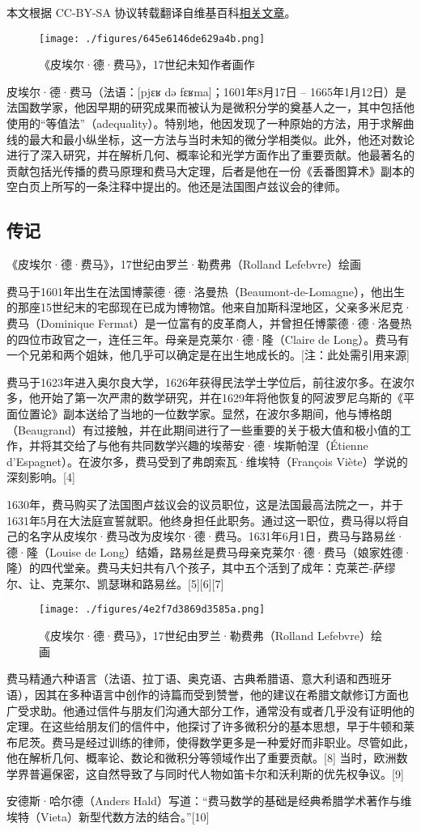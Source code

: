 
本文根据 CC-BY-SA 协议转载翻译自维基百科\href{https://en.wikipedia.org/wiki/Pierre_de_Fermat}{相关文章}。

\begin{figure}[ht]
\centering
\texttt{[image: ./figures/645e6146de629a4b.png]}
\caption{《皮埃尔·德·费马》，17世纪未知作者画作} \label{fig_Pierre_1}
\end{figure}
皮埃尔·德·费马（法语：[pjɛʁ də fɛʁma]；1601年8月17日 – 1665年1月12日）是法国数学家，他因早期的研究成果而被认为是微积分学的奠基人之一，其中包括他使用的“等值法”（adequality）。特别地，他因发现了一种原始的方法，用于求解曲线的最大和最小纵坐标，这一方法与当时未知的微分学相类似。此外，他还对数论进行了深入研究，并在解析几何、概率论和光学方面作出了重要贡献。他最著名的贡献包括光传播的费马原理和费马大定理，后者是他在一份《丢番图算术》副本的空白页上所写的一条注释中提出的。他还是法国图卢兹议会的律师。
\subsection{传记}
《皮埃尔·德·费马》，17世纪由罗兰·勒费弗（Rolland Lefebvre）绘画

费马于1601年出生在法国博蒙德·德·洛曼热（Beaumont-de-Lomagne），他出生的那座15世纪末的宅邸现在已成为博物馆。他来自加斯科涅地区，父亲多米尼克·费马（Dominique Fermat）是一位富有的皮革商人，并曾担任博蒙德·德·洛曼热的四位市政官之一，连任三年。母亲是克莱尔·德·隆（Claire de Long）。费马有一个兄弟和两个姐妹，他几乎可以确定是在出生地成长的。[注：此处需引用来源]

费马于1623年进入奥尔良大学，1626年获得民法学士学位后，前往波尔多。在波尔多，他开始了第一次严肃的数学研究，并在1629年将他恢复的阿波罗尼乌斯的《平面位置论》副本送给了当地的一位数学家。显然，在波尔多期间，他与博格朗（Beaugrand）有过接触，并在此期间进行了一些重要的关于极大值和极小值的工作，并将其交给了与他有共同数学兴趣的埃蒂安·德·埃斯帕涅（Étienne d'Espagnet）。在波尔多，费马受到了弗朗索瓦·维埃特（François Viète）学说的深刻影响。[4]

1630年，费马购买了法国图卢兹议会的议员职位，这是法国最高法院之一，并于1631年5月在大法庭宣誓就职。他终身担任此职务。通过这一职位，费马得以将自己的名字从皮埃尔·费马改为皮埃尔·德·费马。1631年6月1日，费马与路易丝·德·隆（Louise de Long）结婚，路易丝是费马母亲克莱尔·德·费马（娘家姓德·隆）的四代堂亲。费马夫妇共有八个孩子，其中五个活到了成年：克莱芒-萨缪尔、让、克莱尔、凯瑟琳和路易丝。[5][6][7]
\begin{figure}[ht]
\centering
\texttt{[image: ./figures/4e2f7d3869d3585a.png]}
\caption{《皮埃尔·德·费马》，17世纪由罗兰·勒费弗（Rolland Lefebvre）绘画} \label{fig_Pierre_2}
\end{figure}
费马精通六种语言（法语、拉丁语、奥克语、古典希腊语、意大利语和西班牙语），因其在多种语言中创作的诗篇而受到赞誉，他的建议在希腊文献修订方面也广受求助。他通过信件与朋友们沟通大部分工作，通常没有或者几乎没有证明他的定理。在这些给朋友们的信件中，他探讨了许多微积分的基本思想，早于牛顿和莱布尼茨。费马是经过训练的律师，使得数学更多是一种爱好而非职业。尽管如此，他在解析几何、概率论、数论和微积分等领域作出了重要贡献。[8] 当时，欧洲数学界普遍保密，这自然导致了与同时代人物如笛卡尔和沃利斯的优先权争议。[9]

安德斯·哈尔德（Anders Hald）写道：“费马数学的基础是经典希腊学术著作与维埃特（Vieta）新型代数方法的结合。”[10]